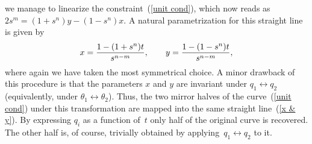 \documentclass[aps,prl,twocolumn,showpacs]{revtex4}
\newcommand{\ke}[1]{|#1\rangle}
\begin{document}
%
we manage to linearize the constraint~(\ref{unit cond}),
which now reads as $2s^m=(1+s^n)y-(1-s^n)x$. A natural parametrization for this straight line is given by 
%
\begin{equation}
x={1-(1+s^n)t\over s^{n-m}},\qquad y={1-(1-s^n)t \over s^{n-m}},
\label{x & y}
\end{equation}
%
where again we have taken the most symmetrical choice.
%
%
A minor drawback of this procedure is that the parameters $x$ and $y$ are invariant under $q_1\leftrightarrow q_2$ (equivalently, under $\theta_1\leftrightarrow \theta_2$). Thus, the two mirror halves of the curve~(\ref{unit cond}) under this transformation are mapped into the same straight line~(\ref{x & y}). By expressing $q_i$ as a function of~$t$ only half of the original curve is recovered. The other half is, of course, trivially obtained by applying~$q_1\leftrightarrow q_2$ to it.
\end{document}
